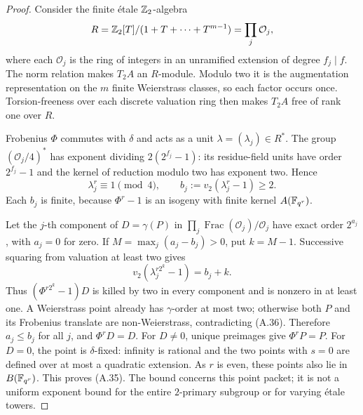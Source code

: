 \begin{proof}
Consider the finite \'etale $\mathbb Z_2$-algebra
\[
 R=\mathbb Z_2[T]/(1+T+\cdots+T^{m-1})
       =\prod_j\mathcal O_j,
\]
where each $\mathcal O_j$ is the ring of integers in
an unramified extension of degree $f_j\mid f$.
The norm relation makes $T_2A$ an $R$-module.
Modulo two it is the augmentation representation on
the $m$ finite Weierstrass classes, so each factor
occurs once. Torsion-freeness over each discrete
valuation ring then makes $T_2A$ free of rank one
over $R$.

Frobenius $\Phi$ commutes with $\delta$ and acts as a
unit $\lambda=(\lambda_j)\in R^*$. The group
$(\mathcal O_j/4)^*$ has exponent dividing
$2(2^{f_j}-1)$: its residue-field units have order
$2^{f_j}-1$ and the kernel of reduction modulo two
has exponent two. Hence
\[
 \lambda_j^r\equiv1\pmod4,
 \qquad b_j:=v_2(\lambda_j^r-1)\ge2.                   \tag{A.37}
\]
Each $b_j$ is finite, because $\Phi^r-1$ is an
isogeny with finite kernel $A(\mathbb F_{q^r})$.

Let the $j$-th component of $D=\gamma(P)$ in
$\prod_j\operatorname{Frac}(\mathcal O_j)/\mathcal O_j$
have exact order $2^{a_j}$, with $a_j=0$ for zero.
If $M=\max_j(a_j-b_j)>0$, put $k=M-1$.
Successive squaring from valuation at least two gives
\[
 v_2(\lambda_j^{r2^k}-1)=b_j+k.
\]
Thus $(\Phi^{r2^k}-1)D$ is killed by two in every
component and is nonzero in at least one. A
Weierstrass point already has $\gamma$-order at most
two; otherwise both $P$ and its Frobenius translate
are non-Weierstrass, contradicting (A.36). Therefore
$a_j\le b_j$ for all $j$, and $\Phi^rD=D$.
For $D\ne0$, unique preimages give $\Phi^rP=P$.
For $D=0$, the point is $\delta$-fixed: infinity is
rational and the two points with $s=0$ are defined
over at most a quadratic extension. As $r$ is even,
these points also lie in $B(\mathbb F_{q^r})$. This proves
(A.35). The bound concerns this point packet; it
is not a uniform exponent bound for the entire
$2$-primary subgroup or for varying \'etale towers.
\end{proof}

